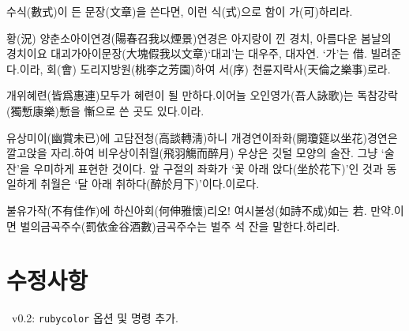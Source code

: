 \documentclass[a4paper,12pt,itemph,footnote]{oblivoir}
\begin{document}
\begin{grruby}
수식(數式)이 든 문장(文章)을 쓴다면,
이런 식(式)으로 함이 가(可)하리라.
\end{grruby}

\begin{grrubypars}
황(況) 양춘소아이연경(陽春召我以煙景){연경은 아지랑이 낀 경치, 아름다운 봄날의 경치}이요
대괴가아이문장(大塊假我以文章){`대괴'는 대우주, 대자연. `가'는 借. 빌려준다.}이라,
회(會) 도리지방원(桃李之芳園)하여 서(序) 천륜지락사(天倫之樂事)로라.

 개위혜련(皆爲惠連){모두가 혜련이 될 만하다.}이어늘
오인영가(吾人詠歌)는 독참강락(獨慙康樂){慙을 慚으로 쓴 곳도 있다.}이라.

\jiwon[13]
\OffStuff{\jiwon[15]}
\jiwon[16]

유상미이(幽賞未已)에 고담전청(高談轉淸)하니
개경연이좌화(開瓊筵以坐花){경연은 깔고앉을 자리.}하여
비우상이취월(飛羽觴而醉月)%
{우상은 깃털 모양의 술잔. 그냥 `술잔'을 우미하게 표현한 것이다.
 앞 구절의 좌화가 `꽃 아래 앉다(坐於花下)'인 것과 동일하게
 취월은 `달 아래 취하다(醉於月下)'이다.}이로다.

불유가작(不有佳作)에 하신아회(何伸雅懷)리오!
여시불성(如詩不成){如는 若. 만약.}이면
벌의금곡주수(罰依金谷酒數){금곡주수는 벌주 석 잔을 말한다.}하리라.
\end{grrubypars}

\bigskip


\section{수정사항}

\textbullet\ v0.2: \texttt{rubycolor} 옵션 및 \mycmd{\grrubycolor} 명령 추가.
\end{document}
